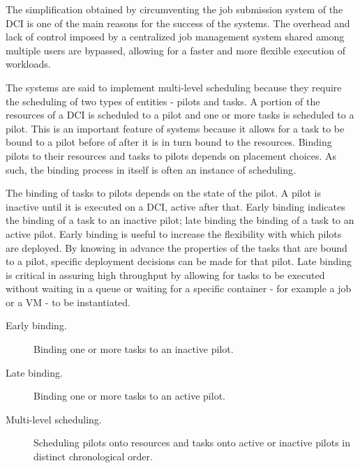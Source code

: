 \documentclass{sig-alternate}
\begin{document}
The simplification obtained by circumventing the job submission system of the
DCI is one of the main reasons for the success of the \pilotjob systems. The
overhead and lack of control imposed by a centralized job management system
shared among multiple users are bypassed, allowing for a faster and more
flexible execution of workloads. 

The \pilotjob systems are said to implement multi-level scheduling because they
require the scheduling of two types of entities - pilots and tasks. A portion of
the resources of a DCI is scheduled to a pilot and one or more tasks is
scheduled to a pilot.  This is an important
feature of \pilotjob systems because it allows for a task to be bound to a pilot
before of after it is in turn bound to the resources. Binding pilots to their
resources and tasks to pilots depends on placement choices. As such, the binding
process in itself is often an instance of scheduling.

The binding of tasks to pilots depends on the state of the pilot. A pilot is
inactive until it is executed on a DCI, active after that. Early binding
indicates the binding of a task to an inactive pilot; late binding the binding
of a task to an active pilot. Early binding is useful to increase the
flexibility with which pilots are deployed. By knowing in advance the
properties of the tasks that are bound to a pilot, specific deployment
decisions can be made for that pilot. Late binding is critical in assuring high
throughput by allowing for tasks to be executed without waiting in a queue or
waiting for a specific container - for example a job or a VM - to be
instantiated.


\begin{description}

\item[Early binding.] Binding one or more tasks to an inactive pilot.

\item[Late binding.] Binding one or more tasks to an active pilot.

\item[Multi-level scheduling.] Scheduling pilots onto resources and tasks onto
active or inactive pilots in distinct chronological order.

\end{description}
\end{document}
